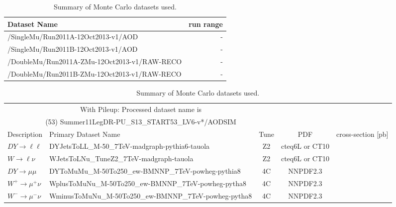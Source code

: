 \begin{table}[!ht]
\begin{center}
\begin{tabular}{l|r}
\hline
Dataset Name & run range \\
\hline
\hline

  /SingleMu/Run2011A-12Oct2013-v1/AOD & -  \\
  /SingleMu/Run2011B-12Oct2013-v1/AOD & -  \\
  /DoubleMu/Run2011A-ZMu-12Oct2013-v1/RAW-RECO & -  \\
  /DoubleMu/Run2011B-ZMu-12Oct2013-v1/RAW-RECO & -  \\

\hline
\end{tabular}
\caption{Summary of data datasets used.\label{tab:DatasetsData}}
\end{center}
\begin{center}
{\footnotesize
\begin{tabular}{l|l|c|c|c|}
\hline
\multicolumn{3}{c}{With Pileup: Processed dataset name is} \\
\multicolumn{3}{c}{(53) Summer11LegDR-PU\_S13\_START53\_LV6-v*/AODSIM} \\
\hline
 Description                     &   Primary Dataset Name   & Tune & PDF & cross-section [pb]\\
\hline
$ DY \rightarrow \ell \ell$  & DYJetsToLL\_M-50\_7TeV-madgraph-pythia6-tauola & Z2 & cteq6L or CT10 &  \\
$ W \rightarrow \ell \nu$ & WJetsToLNu\_TuneZ2\_7TeV-madgraph-tauola & Z2 & cteq6L or CT10 &  \\
$ DY \rightarrow \mu \mu$  &  DYToMuMu\_M-50To250\_ew-BMNNP\_7TeV-powheg-pythia8 & 4C & NNPDF2.3 &  \\
$ W^{+} \rightarrow \mu^{+} \nu$ &  WplusToMuNu\_M-50To250\_ew-BMNNP\_7TeV-powheg-pytha8 & 4C & NNPDF2.3 & \\
$ W^{-} \rightarrow \mu^{-} \nu$ & WminusToMuNu\_M-50To250\_ew-BMNNP\_7TeV-powheg-pytha8 & 4C & NNPDF2.3 & \\
\hline
\end{tabular}
}
\caption{Summary of Monte Carlo datasets used.
\label{tab:DatasetsMC}}
\end{center}
\end{table}

